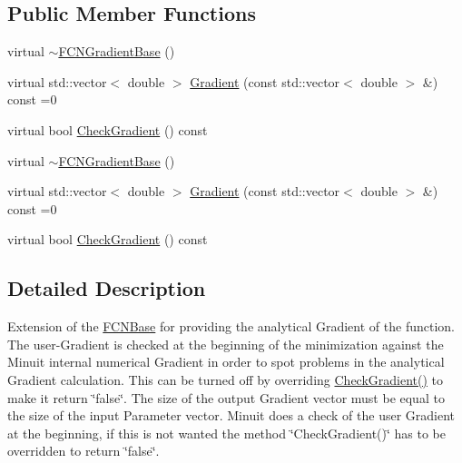\subsection*{Public Member Functions}
\begin{DoxyCompactItemize}
\item 
virtual \mbox{\hyperlink{classROOT_1_1Minuit2_1_1FCNGradientBase_a6461fcfe2420af00a55f44c8f683ee25}{$\sim$\+F\+C\+N\+Gradient\+Base}} ()
\item 
virtual std\+::vector$<$ double $>$ \mbox{\hyperlink{classROOT_1_1Minuit2_1_1FCNGradientBase_a004740e7e25a1358aafde6694196ef88}{Gradient}} (const std\+::vector$<$ double $>$ \&) const =0
\item 
virtual bool \mbox{\hyperlink{classROOT_1_1Minuit2_1_1FCNGradientBase_ae69375c7506f0be6a1ab4e4e937ac555}{Check\+Gradient}} () const
\item 
virtual \mbox{\hyperlink{classROOT_1_1Minuit2_1_1FCNGradientBase_a6461fcfe2420af00a55f44c8f683ee25}{$\sim$\+F\+C\+N\+Gradient\+Base}} ()
\item 
virtual std\+::vector$<$ double $>$ \mbox{\hyperlink{classROOT_1_1Minuit2_1_1FCNGradientBase_a004740e7e25a1358aafde6694196ef88}{Gradient}} (const std\+::vector$<$ double $>$ \&) const =0
\item 
virtual bool \mbox{\hyperlink{classROOT_1_1Minuit2_1_1FCNGradientBase_ae69375c7506f0be6a1ab4e4e937ac555}{Check\+Gradient}} () const
\end{DoxyCompactItemize}


\subsection{Detailed Description}
Extension of the \mbox{\hyperlink{classROOT_1_1Minuit2_1_1FCNBase}{F\+C\+N\+Base}} for providing the analytical Gradient of the function. The user-\/\+Gradient is checked at the beginning of the minimization against the Minuit internal numerical Gradient in order to spot problems in the analytical Gradient calculation. This can be turned off by overriding \mbox{\hyperlink{classROOT_1_1Minuit2_1_1FCNGradientBase_ae69375c7506f0be6a1ab4e4e937ac555}{Check\+Gradient()}} to make it return \char`\"{}false\char`\"{}. The size of the output Gradient vector must be equal to the size of the input Parameter vector. Minuit does a check of the user Gradient at the beginning, if this is not wanted the method \char`\"{}\+Check\+Gradient()\char`\"{} has to be overridden to return \char`\"{}false\char`\"{}. 

